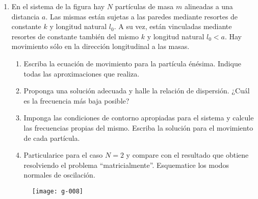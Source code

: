 \documentclass[11pt,spanish,a4paper]{article}
\begin{document}
\begin{enumerate}
\item
En el sistema de la figura hay \(N\) partículas de masa \(m\) alineadas a una distancia \(a\).
Las mismas están sujetas a las paredes mediante resortes de constante \(k\) y longitud natural \(l_0\).
A su vez, están vinculadas mediante resortes de constante también del mismo \(k\) y longitud natural \(l_0 < a\).
Hay movimiento sólo en la dirección longitudinal a las masas.
\begin{enumerate}
	\item Escriba la ecuación de movimiento para la partícula énésima.
	Indique todas las aproximaciones que realiza.
	\item Proponga una solución adecuada y halle la relación de dispersión.
	¿Cuál es la frecuencia más baja posible?
	\item Imponga las condiciones de contorno apropiadas para el sistema y calcule las frecuencias propias del mismo.
	Escriba la solución para el movimiento de cada partícula.
	\item Particularice para el caso \(N = 2\) y compare con el resultado que obtiene resolviendo el problema ``matricialmente''.
	Esquematice los modos normales de oscilación.	
\end{enumerate}
\begin{figure}[h]
	\centering
	\texttt{[image: g-008]}
\end{figure}




\end{enumerate}
\end{document}
